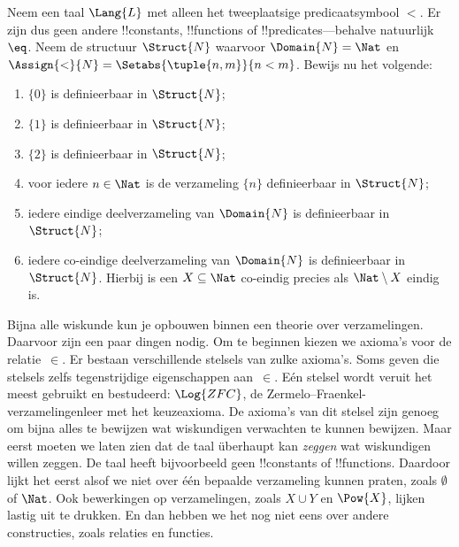 \documentclass[openany]{memoir}
\begin{document}
\begin{prob}
Neem een taal $\Lang{L}$ met alleen het tweeplaatsige predicaatsymbool
$<$. Er zijn dus geen andere !!{constant}s, !!{function}s of
!!{predicate}s---behalve natuurlijk~$\eq$. Neem de structuur
$\Struct{N}$ waarvoor $\Domain{N} = \Nat$ en
$\Assign{<}{N} = \Setabs{\tuple{n,m}}{n < m}$. Bewijs nu het volgende:
\begin{enumerate}
\item $\{ 0 \}$ is definieerbaar in $\Struct{N}$;
\item $\{ 1 \}$ is definieerbaar in $\Struct{N}$;
\item $\{ 2 \}$ is definieerbaar in $\Struct{N}$;
\item voor iedere $n \in \Nat$ is de verzameling $\{ n \}$
  definieerbaar in $\Struct{N}$;
\item iedere eindige deelverzameling van $\Domain{N}$ is definieerbaar
  in $\Struct{N}$;
\item iedere co-eindige deelverzameling van $\Domain{N}$ is
  definieerbaar in $\Struct{N}$. Hierbij is een $X \subseteq \Nat$
  co-eindig precies als $\Nat \setminus X$ eindig is.
\end{enumerate}
\end{prob}
\endgroup

\begingroup
\def\olfilename{OLP-0172}
\def\olfilepath{content/first-order-logic/models-theories/}
\hypertarget{unit-OLP-0172}{}





Bijna alle wiskunde kun je opbouwen binnen een theorie over
verzamelingen. Daarvoor zijn een paar dingen nodig. Om te beginnen
kiezen we axioma's voor de relatie~$\in$. Er bestaan verschillende
stelsels van zulke axioma's. Soms geven die stelsels zelfs
tegenstrijdige eigenschappen aan~$\in$. Eén stelsel wordt veruit het
meest gebruikt en bestudeerd: $\Log{ZFC}$, de
Zermelo--Fraenkel-verzamelingenleer met het keuzeaxioma. De axioma's van
dit stelsel zijn genoeg om bijna alles te bewijzen wat wiskundigen
verwachten te kunnen bewijzen. Maar eerst moeten we laten zien dat de
taal überhaupt kan \emph{zeggen} wat wiskundigen willen zeggen. De
taal heeft bijvoorbeeld geen !!{constant}s of !!{function}s. Daardoor
lijkt het eerst alsof we niet over één bepaalde verzameling kunnen
praten, zoals $\emptyset$ of $\Nat$. Ook bewerkingen op verzamelingen,
zoals $X \cup Y$ en $\Pow{X}$, lijken lastig uit te drukken. En dan
hebben we het nog niet eens over andere constructies, zoals relaties en
functies.
\end{document}
